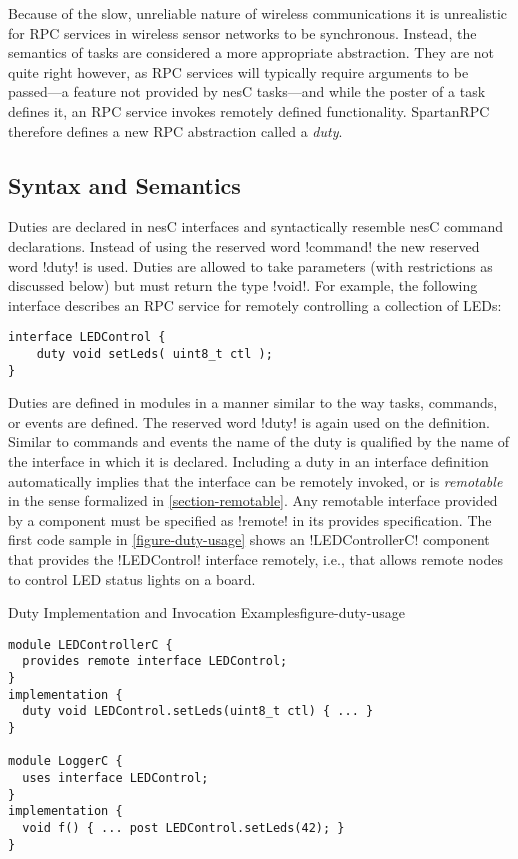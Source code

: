 Because of the slow, unreliable nature of wireless communications it is unrealistic for RPC
services in wireless sensor networks to be synchronous. Instead, the semantics of tasks are
considered a more appropriate abstraction. They are not quite right however, as RPC services
will typically require arguments to be passed---a feature not provided by nesC tasks---and while
the poster of a task defines it, an RPC service invokes remotely defined functionality.
SpartanRPC therefore defines a new RPC abstraction called a \emph{duty}.

\subsection{Syntax and Semantics}
\label{section-duties-syntax}

Duties are declared in nesC interfaces and syntactically resemble nesC command declarations.
Instead of using the reserved word !command! the new reserved word !duty! is used. Duties are
allowed to take parameters (with restrictions as discussed below) but must return the type
!void!. For example, the following interface describes an RPC service for remotely controlling a
collection of LEDs:

\singlespace
\begin{lstlisting}
interface LEDControl {
    duty void setLeds( uint8_t ctl );
}
\end{lstlisting}
\primaryspacing

Duties are defined in modules in a manner similar to the way tasks, commands, or events are
defined. The reserved word !duty! is again used on the definition. Similar to commands and
events the name of the duty is qualified by the name of the interface in which it is declared.
Including a duty in an interface definition automatically implies that the interface can be
remotely invoked, or is \emph{remotable} in the sense formalized in \autoref{section-remotable}.
Any remotable interface provided by a component must be specified as !remote! in its provides
specification. The first code sample in \autoref{figure-duty-usage} shows an !LEDControllerC!
component that provides the !LEDControl! interface remotely, i.e., that allows remote nodes to
control LED status lights on a board.

\begin{fpfig}[t]{Duty Implementation and Invocation Examples}{figure-duty-usage}
{
\singlespace
\begin{lstlisting}
module LEDControllerC {
  provides remote interface LEDControl;
}
implementation {
  duty void LEDControl.setLeds(uint8_t ctl) { ... }
} 
 
module LoggerC {
  uses interface LEDControl;
}
implementation {
  void f() { ... post LEDControl.setLeds(42); }
}
\end{lstlisting}
\primaryspacing
}
\end{fpfig}

